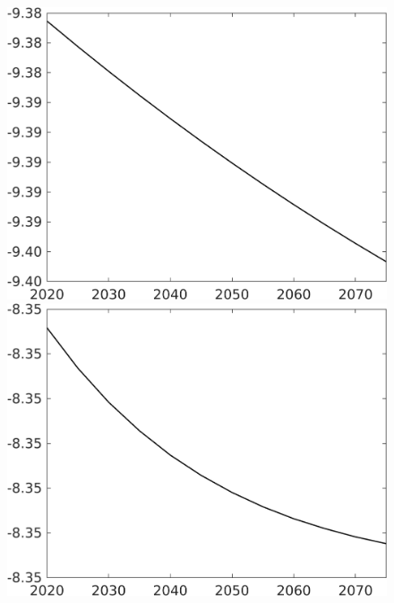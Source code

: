\documentclass[12pt]{article}
\begin{document}
\begin{figure}[h!!]
\begin{minipage}[]{0.32\textwidth}
	\end{minipage}	
	\begin{minipage}[]{0.32\textwidth}
		\includegraphics[width=1\textwidth]{../../codding_model/own_basedOnFried/optimalPol_010922_revision/figures/all_13Sept22/CompTaul_LFBAUPer_Reg0_Lg_spillover0_nsk0_xgr1_knspil1_sep1_countec0_GovRev0_etaa0.79.png}
	\end{minipage}	
	\begin{minipage}[]{0.32\textwidth}
		\includegraphics[width=1\textwidth]{../../codding_model/own_basedOnFried/optimalPol_010922_revision/figures/all_13Sept22/CompTaul_LFBAUPer_Reg0_Ln_spillover0_nsk0_xgr1_knspil1_sep1_countec0_GovRev0_etaa0.79.png}
	\end{minipage}	
\end{figure}
\end{document}
